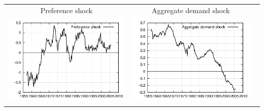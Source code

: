 \documentclass{beamer}
\begin{document}
{\begin{center}
\begin{tabular}{ccc}
  \small{Preference shock} & \small{Aggregate demand shock} & \\
  \includegraphics[scale=0.23]{plots2/cap_re_prefsh.png} & \includegraphics[scale=0.23]{plots2/cap_re_ADsh.png} & \\ \\
  \end{tabular}
  \end{center}
}
\end{document}
